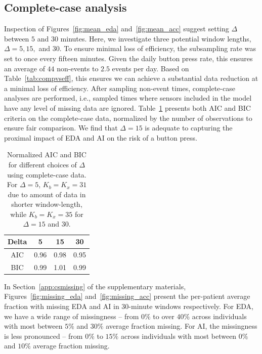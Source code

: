 \documentclass[12pt]{amsart}
\newenvironment{newmaterial}{\color{blue}}{\par}
\begin{document}
\subsection{Complete-case analysis}


Inspection of Figures~\ref{fig:mean_eda} and~\ref{fig:mean_acc} suggest setting $\Delta$ between $5$ and $30$ minutes. Here, we investigate three potential window lengths, $\Delta = 5, 15,$ and $30$.  To ensure minimal loss of efficiency, the subsampling rate was set to once every fifteen minutes.  Given the daily button press rate, this ensures an average of $44$ non-events to $2.5$ events per day.  Based on Table~\ref{tab:compvseff}, this ensures we can achieve a substantial data reduction at a minimal loss of efficiency.  After sampling non-event times, complete-case analyses are performed, i.e., sampled times where sensors included in the model have any level of missing data are ignored.  Table~\ref{tab:aicbic} presents both AIC and BIC criteria on the complete-case data, normalized by the number of observations to ensure fair comparison. We find that $\Delta = 15$ is adequate to capturing the proximal impact of EDA and AI on the risk of a button press.

\begin{table}
\begin{tabular}{c c c c}
Delta & 5 & 15 & 30 \\ \hline
AIC & 0.96 & 0.98 & 0.95 \\
BIC & 0.99 & 1.01 & 0.99 \\ \hline
\end{tabular}
\caption{Normalized AIC and BIC for different choices of $\Delta$ using complete-case data. For $\Delta = 5$, $K_b = K_x = 31$ due to amount of data in shorter window-length, while $K_b=K_x = 35$ for $\Delta = 15$ and $30$.}
\label{tab:aicbic}
\end{table}


In Section~\ref{app:csmissing} of the supplementary materials, Figures~\ref{fig:missing_eda} and~\ref{fig:missing_acc} present the per-patient average fraction with missing EDA and AI in 30-minute windows respectively. For EDA, we have a wide range of missingness -- from $0\%$ to over $40$\% across individuals with most between $5\%$ and $30\%$ average fraction missing.  For AI, the missingness is less pronounced -- from $0\%$ to $15\%$ across individuals with most between $0\%$ and $10\%$ average fraction missing.
\end{document}
